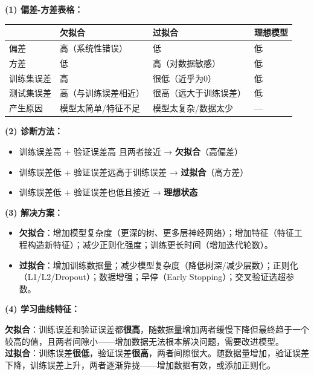 \documentclass[a4paper,11pt]{ctexart}
\begin{document}
\begin{solutionbox}[参考答案与详细解析]
    \textbf{(1) 偏差-方差表格：}
    \begin{center}
    \begin{tabular}{p{2.5cm} p{3cm} p{3cm} p{3.5cm}}
        \toprule
        & 欠拟合 & 过拟合 & 理想模型 \\
        \midrule
        偏差 & 高（系统性错误） & 低 & 低 \\
        方差 & 低 & 高（对数据敏感） & 低 \\
        训练集误差 & 高 & 很低（近乎为0） & 低 \\
        测试集误差 & 高（与训练误差相近） & 很高（远大于训练误差） & 低 \\
        产生原因 & 模型太简单/特征不足 & 模型太复杂/数据太少 & — \\
        \bottomrule
    \end{tabular}
    \end{center}

    \textbf{(2) 诊断方法：}
    \begin{itemize}
        \item 训练误差高 + 验证误差高 且两者接近 → \textbf{欠拟合}（高偏差）
        \item 训练误差低 + 验证误差远高于训练误差 → \textbf{过拟合}（高方差）
        \item 训练误差低 + 验证误差也低且接近 → \textbf{理想状态}
    \end{itemize}

    \textbf{(3) 解决方案：}
    \begin{itemize}
        \item \textbf{欠拟合}：增加模型复杂度（更深的树、更多层神经网络）；增加特征（特征工程构造新特征）；减少正则化强度；训练更长时间（增加迭代轮数）。
        \item \textbf{过拟合}：增加训练数据量；减少模型复杂度（降低树深/减少层数）；正则化（L1/L2/Dropout）；数据增强；早停（Early Stopping）；交叉验证选超参数。
    \end{itemize}

    \textbf{(4) 学习曲线特征：}

    \begin{keybox}[学习曲线诊断]
        \textbf{欠拟合}：训练误差和验证误差都\textbf{很高}，随数据量增加两者缓慢下降但最终趋于一个较高的值，且两者间隙小——增加数据无法根本解决问题，需要改进模型。\\
        \textbf{过拟合}：训练误差\textbf{很低}，验证误差\textbf{很高}，两者间隙很大。随数据量增加，验证误差下降，训练误差上升，两者逐渐靠拢——增加数据有效，或添加正则化。
    \end{keybox}
\end{solutionbox}
\end{document}

